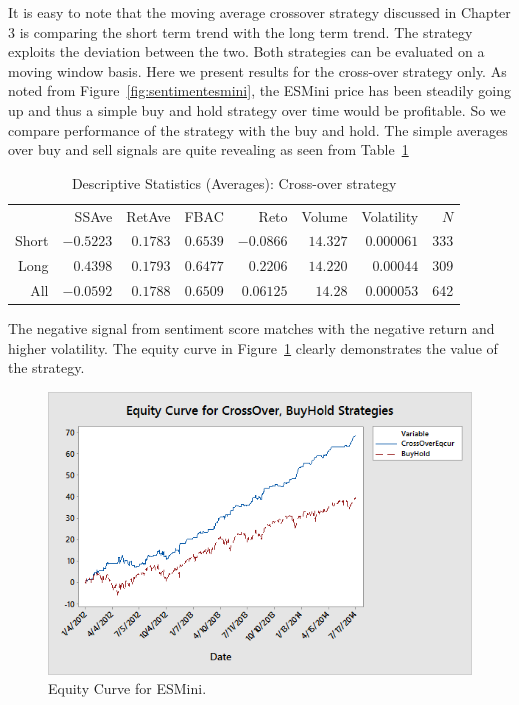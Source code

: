 It is easy to note that the moving average crossover strategy discussed in Chapter 3 is comparing the short term trend with the long term trend. The strategy exploits the deviation between the two. Both strategies can be evaluated on a moving window basis. Here we present results for the cross-over strategy only. As noted from Figure~\ref{fig:sentimentesmini}, the ESMini price has been steadily going up and thus a simple buy and hold strategy over time would be profitable. So we compare performance of the strategy with the buy and hold. The simple averages over buy and sell signals are quite revealing as seen from Table~\ref{tab:descstatcross}

\begin{table}[!ht]
\centering
\caption{Descriptive Statistics (Averages): Cross-over strategy \label{tab:descstatcross}}
\begin{tabular}{rrrrrrrr}
 & SSAve & RetAve & FBAC & Reto & Volume & Volatility & $N$ \\
Short  & $-0.5223$ & $0.1783$ & $0.6539$ & $-0.0866$ & $14.327$ & $0.000061$ & 333 \\
 Long & $0.4398$ & $0.1793$ & $0.6477$ & $0.2206$ & $14.220$ & $0.00044$ & 309 \\
 All & $-0.0592$ & $0.1788$ & $0.6509$ & $0.06125$ & $14.28$ & $0.000053$ & 642
\end{tabular} 
\end{table}

The negative signal from sentiment score matches with the negative return and higher volatility. The equity curve in Figure~\ref{fig:equitycross} clearly demonstrates the value of the strategy. 


\begin{figure}[!ht]
\centering
\includegraphics[width=\textwidth]{chapters/chapter_news_an/figures/ch4sec4equitycross} 
\caption{Equity Curve for ESMini. \label{fig:equitycross}}
\end{figure}


